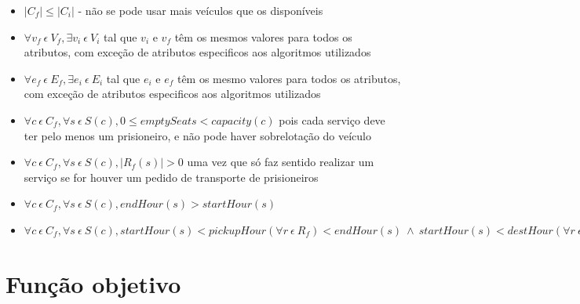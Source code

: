\documentclass[article, a4paper, 12pt, oneside]{memoir}
\begin{document}
\begin{itemize}
	\item $\vert C_f \vert \leq \vert C_i \vert $ - não se pode usar mais veículos que os disponíveis
	\item $\forall v_f ~ \epsilon ~ V_f, \exists v_i ~ \epsilon ~ V_i$ tal que $v_i$ e $v_f$ têm os mesmos valores para todos os atributos, com exceção de atributos especificos aos algoritmos utilizados
	\item $\forall e_f ~ \epsilon ~ E_f, \exists e_i ~ \epsilon ~ E_i$ tal que $e_i$ e $e_f$ têm os mesmo valores para todos os atributos, com exceção de atributos especificos aos algoritmos utilizados
	\item $\forall c ~ \epsilon ~ C_f, \forall s ~ \epsilon ~ S(c), 0 \leq emptySeats < capacity(c)$ pois cada serviço deve ter pelo menos um prisioneiro, e não pode haver sobrelotação do veículo
	\item $\forall c ~ \epsilon ~ C_f, \forall s ~ \epsilon ~ S(c), \vert R_f(s) \vert > 0$ uma vez que só faz sentido realizar um serviço se for houver um pedido de transporte de prisioneiros
	\item $\forall c ~ \epsilon ~ C_f, \forall s ~ \epsilon ~ S(c), endHour(s) > startHour(s)$
	\item $\forall c ~ \epsilon ~ C_f, \forall s ~ \epsilon ~ S(c), startHour(s) < pickupHour(\forall r ~ \epsilon ~ R_f) < endHour(s) ~ \wedge ~ startHour(s) < destHour(\forall r ~ \epsilon ~ R_f) \leq endHour(s)$
\end{itemize}

\section{Função objetivo}
\end{document}
